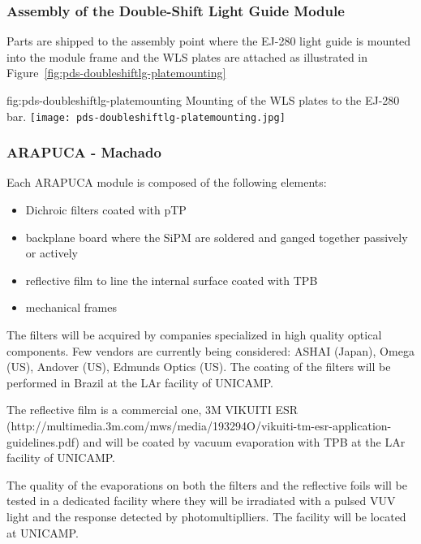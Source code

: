 \subsubsection{Assembly of the Double-Shift Light Guide Module}

Parts are shipped to the assembly point where the EJ-280 light guide is mounted into the module frame and the WLS plates are attached as illustrated in Figure~\ref{fig:pds-doubleshiftlg-platemounting}

\begin{dunefigure}{fig:pds-doubleshiftlg-platemounting}
{Mounting of the WLS plates to the EJ-280 bar.}
  \texttt{[image: pds-doubleshiftlg-platemounting.jpg]}
\end{dunefigure}



\subsubsection{\color{red}\bf ARAPUCA - Machado}
\label{ssec:fdsp-pd-pc-prod-arapuca}

Each ARAPUCA module is composed of the following elements: 
\begin{itemize}
\item Dichroic filters coated with pTP 
\item backplane board where the SiPM are soldered and ganged together passively or actively
\item reflective film to line the internal surface coated with TPB 
\item mechanical frames  
\end{itemize}

The filters will be acquired by companies specialized in high quality optical components. Few vendors are currently being considered: ASHAI (Japan), Omega (US), Andover (US), Edmunds Optics (US). The coating of the filters will be performed in Brazil at the LAr facility of UNICAMP.  

The reflective film is a commercial one, 3M VIKUITI ESR (http://multimedia.3m.com/mws/media/193294O/vikuiti-tm-esr-application-guidelines.pdf) and will be coated by vacuum evaporation with TPB at the LAr facility of UNICAMP.  

The quality of the evaporations on both the filters and the reflective foils will be tested in a dedicated facility where they will be irradiated with a pulsed VUV light and the response detected by photomultiplliers. The facility will be located at UNICAMP.  

